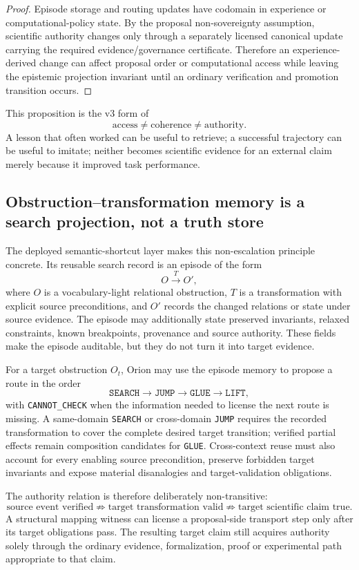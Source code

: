 \begin{proof}
Episode storage and routing updates have codomain in experience or computational-policy state. By the proposal non-sovereignty assumption, scientific authority changes only through a separately licensed canonical update carrying the required evidence/governance certificate. Therefore an experience-derived change can affect proposal order or computational access while leaving the epistemic projection invariant until an ordinary verification and promotion transition occurs.
\end{proof}

This proposition is the v3 form of
\[
\text{access}\neq\text{coherence}\neq\text{authority}.
\]
A lesson that often worked can be useful to retrieve; a successful trajectory can be useful to imitate; neither becomes scientific evidence for an external claim merely because it improved task performance.

\subsection{Obstruction--transformation memory is a search projection, not a truth store}

The deployed semantic-shortcut layer makes this non-escalation principle concrete. Its reusable search record is an episode of the form
\[
O\xrightarrow{T}O',
\]
where $O$ is a vocabulary-light relational obstruction, $T$ is a transformation with explicit source preconditions, and $O'$ records the changed relations or state under source evidence. The episode may additionally state preserved invariants, relaxed constraints, known breakpoints, provenance and source authority. These fields make the episode auditable, but they do not turn it into target evidence.

For a target obstruction $O_t$, Orion may use the episode memory to propose a route in the order
\[
\texttt{SEARCH}\rightarrow\texttt{JUMP}\rightarrow\texttt{GLUE}\rightarrow\texttt{LIFT},
\]
with \texttt{CANNOT\_CHECK} when the information needed to license the next route is missing. A same-domain \texttt{SEARCH} or cross-domain \texttt{JUMP} requires the recorded transformation to cover the complete desired target transition; verified partial effects remain composition candidates for \texttt{GLUE}. Cross-context reuse must also account for every enabling source precondition, preserve forbidden target invariants and expose material disanalogies and target-validation obligations.

The authority relation is therefore deliberately non-transitive:
\[
\text{source event verified}
\not\Rightarrow
\text{target transformation valid}
\not\Rightarrow
\text{target scientific claim true}.
\]
A structural mapping witness can license a proposal-side transport step only after its target obligations pass. The resulting target claim still acquires authority solely through the ordinary evidence, formalization, proof or experimental path appropriate to that claim.

